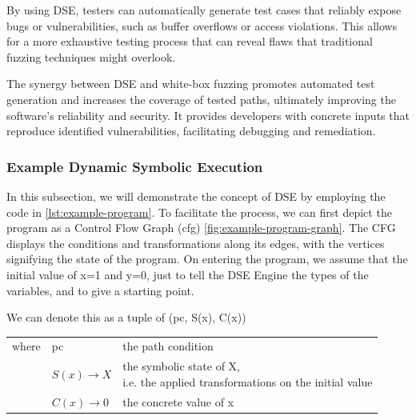 By using DSE, testers can automatically generate test cases that reliably expose bugs or vulnerabilities, such as buffer overflows or access violations. This allows for a more exhaustive testing process that can reveal flaws that traditional fuzzing techniques might overlook.

The synergy between DSE and white-box fuzzing promotes automated test generation and increases the coverage of tested paths, ultimately improving the software's reliability and security. It provides developers with concrete inputs that reproduce identified vulnerabilities, facilitating debugging and remediation.



\subsubsection{Example Dynamic Symbolic Execution}
In this subsection, we will demonstrate the concept of DSE by employing the code in \autoref{lst:example-program}. 
To facilitate the process, we can first depict the program as a Control Flow Graph (\gls{cfg}) \autoref{fig:example-program-graph}. 
The CFG displays the conditions and transformations along its edges, with the vertices signifying the state of the program.
On entering  the program, we assume that the initial value of x=1 and y=0, just to tell the DSE Engine the types of the variables, and to give a starting point. 
\capstartfalse
\begin{center}
    We can denote this as a tuple of (pc, S(x), C(x)) 
    \begin{table}[ht]
        \begin{tabular}{lll}
            where & pc & the path condition \\
             & $S(x) \rightarrow X$& \specialcell[c]{the symbolic state of X,\\ i.e. the applied transformations on the initial value}\\
             & $C(x) \rightarrow 0$& the concrete value of x\\
        \end{tabular}
    \end{table}
\end{center} 
\capstarttrue
\vspace{0.5cm}

